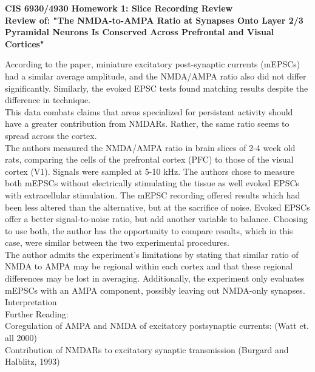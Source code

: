 \documentclass[11pt]{article}
\begin{document}
\begin{center}
{\large {\bf CIS 6930/4930 Homework 1: Slice Recording Review}}\\
{\normalsize {\bf Review of: "The NMDA-to-AMPA Ratio at Synapses Onto Layer 2/3 Pyramidal Neurons
Is Conserved Across Prefrontal and Visual Cortices"}}
\end{center}

According to the paper, miniature excitatory post-synaptic currents (mEPSCs) had
a similar average amplitude, and the NMDA/AMPA ratio also did not differ significantly.
Similarly, the evoked EPSC tests found matching results despite the difference in
technique. \\

This data combats claims that areas specialized for persistant activity should have
a greater contribution from NMDARs.  Rather, the same ratio seems to spread across
the cortex. \\

The authors measured the NMDA/AMPA ratio in brain slices of 2-4 week old rats, comparing
the cells of the prefrontal cortex (PFC) to those of the visual cortex (V1).  Signals
were sampled at 5-10 kHz.  The authors chose to measure both mEPSCs without electrically
stimulating the tissue as well evoked EPSCs with extracellular stimulation.  The mEPSC
recording offered results which had been less altered than the alternative, but at
the sacrifice of noise.  Evoked EPSCs offer a better signal-to-noise ratio, but add
another variable to balance.  Choosing to use both, the author has the opportunity
to compare results, which in this case, were similar between the two experimental
procedures. \\

The author admits the experiment's limitations by stating that similar ratio of NMDA
to AMPA may be regional within each cortex and that these regional differences may
be lost in averaging.  Additionally, the experiment only evaluates mEPSCs with an
AMPA component, possibly leaving out NMDA-only synapses.  \\

Interpretation \\

Further Reading: \\
Coregulation of AMPA and NMDA of excitatory postsynaptic currents: (Watt et. all 2000) \\
Contribution of NMDARs to excitatory synaptic transmission (Burgard and Halblitz, 1993) \\
\end{document}

